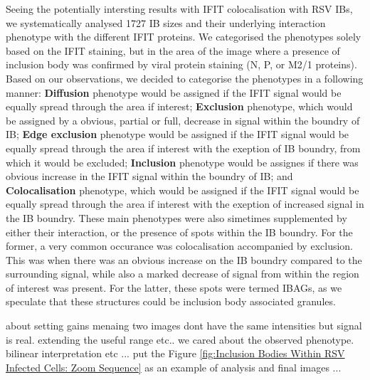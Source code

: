 Seeing the potentially intersting results with IFIT colocalisation with RSV IBs, we systematically analysed 1727 IB sizes and their underlying interaction phenotype with the different IFIT proteins. We categorised the phenotypes solely based on the IFIT staining, but in the area of the image where a presence of inclusion body was confirmed by viral protein staining (N, P, or M2/1 proteins). Based on our observations, we decided to categorise the phenotypes in a following manner: \textbf{Diffusion} phenotype would be assigned if the IFIT signal would be equally spread through the area if interest; \textbf{Exclusion} phenotype, which would be assigned by a obvious, partial or full, decrease in signal within the boundry of IB; \textbf{Edge exclusion} phenotype would be assigned if the IFIT signal would be equally spread through the area if interest with the exeption of IB boundry, from which it would be excluded; \textbf{Inclusion} phenotype would be assignes if there was obvious increase in the IFIT signal within the boundry of IB; and \textbf{Colocalisation} phenotype, which would be assigned if the IFIT signal would be equally spread through the area if interest with the exeption of increased signal in the IB boundry. These main phenotypes were also simetimes supplemented by either their interaction, or the presence of spots within the IB boundry. For the former, a very common occurance was colocalisation accompanied by exclusion. This was when there was an obvious increase on the IB boundry compared to the surrounding signal, while also a marked decrease of signal from within the region of interest was present. For the latter, these spots were termed IBAGs, as we speculate that these structures could be inclusion body associated granules.

about setting gains menaing two images dont have the same intensities but signal is real. extending the useful range etc..  we cared about the observed phenotype. bilinear interpretation etc ... put the Figure \ref{fig:Inclusion Bodies Within RSV Infected Cells: Zoom Sequence} as an example of analysis and final images ... 


